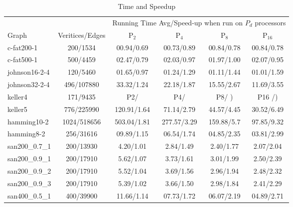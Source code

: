 \documentclass[11pt]{article}
\begin{document}
\linespread{1}
\begin{table*}[ht!]
\caption{Time and Speedup\label{tab:spar_su_par_table}}
\begin{footnotesize}
\begin{center}
\begin{tabular}{|l||c||c|c|c|c|}
\hline
&              & \multicolumn{4}{|c|}{Running Time Avg/Speed-up when run on $P_d$ processors}\\
\cline{3-6}
Graph&Veritices/Edges& 	P$_2$           &P$_4$            &P$_8$            &P$_{16}$   \\
\hline										              			          
c-fat200-1 	    &200/1534 		     &00.94/0.69 &00.73/0.89 &00.84/0.78 &00.84/0.78\\
c-fat500-1 	    &500/4459 		     &02.47/0.79 &02.03/0.97 &01.97/1.00 &02.07/0.95\\
\hline                                                                                   
johnson16-2-4 	&120/5460 		 &01.65/0.97 &01.24/1.29 &01.11/1.44 &01.01/1.59\\
johnson32-2-4 	&496/107880 	 &33.32/1.24 &22.18/1.87 &15.55/2.67 &11.69/3.55\\
\hline                                                                                   
keller4      	&171/9435 			 &P2/     &P4/     &P8/   ) &P16  /)\\  
keller5 	    &776/225990 		 &120.91/1.64 &71.14/2.79 &44.57/4.45 &30.52/6.49\\
\hline                                                                                   
hamming10-2 	&1024/518656 	 &503.04/1.81 &277.57/3.29 &159.88/5.7  &97.85/9.32\\
hamming8-2 	    &256/31616 	     &09.89/1.15 &06.54/1.74 &04.85/2.35 &03.81/2.99\\
\hline                                                                                   
san200\_0.7\_1 	&200/13930 	     &4.20/1.01 &2.84/1.49 &2.40/1.77 &2.07/2.04\\
san200\_0.9\_1 	&200/17910 	     &5.62/1.07 &3.73/1.61 &3.01/1.99 &2.50/2.39\\
san200\_0.9\_2 	&200/17910 	     &5.52/1.04 &3.69/1.56 &2.96/1.94 &2.48/2.32\\
san200\_0.9\_3 	&200/17910 	     &5.39/1.02 &3.66/1.50 &2.98/1.84 &2.41/2.29\\
san400\_0.5\_1 	&400/39900 	     &11.66/1.14 &07.73/1.72 &06.07/2.19 &04.89/2.71\\

\end{tabular}
\end{center}
\end{footnotesize}
\end{table*}
\end{document}
